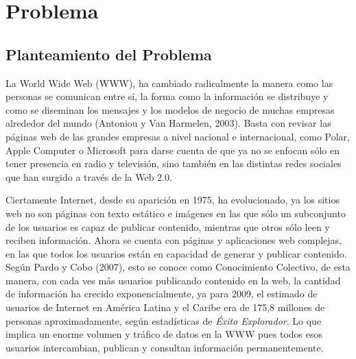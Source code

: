 \chapter{Problema}
\label{chap:problema}


\section{Planteamiento del Problema }

La World Wide Web (WWW), ha cambiado radicalmente la manera como las personas se comunican entre sí, la forma como la información se distribuye y como se diseminan los mensajes y los modelos de negocio de muchas empresas alrededor del mundo (Antoniou y Van Harmelen, 2003). Basta con revisar las páginas web de las grandes empresas a nivel nacional e internacional, como Polar, Apple Computer o Microsoft para darse cuenta de que ya no se enfocan sólo en tener presencia en radio y televisión, sino también en las distintas redes sociales que han surgido a través de la Web 2.0.

Ciertamente Internet, desde su aparición en 1975, ha evolucionado, ya los sitios web no son páginas con texto estático e imágenes en las que sólo un subconjunto de los usuarios es capaz de publicar contenido, mientras que otros sólo leen y reciben información. Ahora se cuenta con páginas y aplicaciones web complejas, en las que todos los usuarios están en capacidad de generar y publicar contenido. Según Pardo y Cobo (2007), esto se conoce como Conocimiento Colectivo, de esta manera, con cada ves más usuarios publicando contenido en la web, la cantidad de información ha crecido exponencialmente, ya para 2009, el estimado de usuarios de Internet en América Latina y el Caribe era de 175,8 millones de personas aproximadamente, según estadísticas de \textit{Éxito Explorador}. Lo que implica un enorme volumen y tráfico de datos en la WWW pues todos esos usuarios intercambian, publican y consultan información permanentemente.

